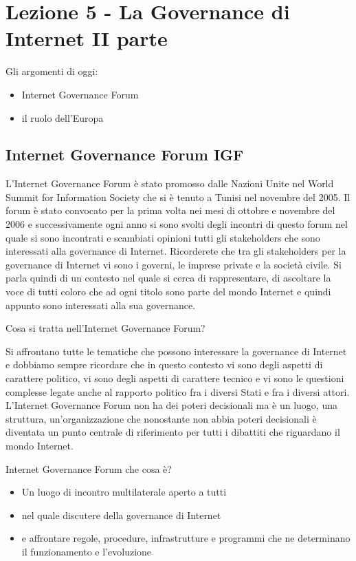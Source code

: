\chapter{Lezione 5 - La Governance di Internet II parte}

Gli argomenti di oggi:

\begin{itemize}
    \item Internet Governance Forum
    \item il ruolo dell'Europa
\end{itemize}

\section{Internet Governance Forum IGF}

L'Internet Governance Forum è stato promosso dalle Nazioni Unite nel World Summit for Information Society che si è tenuto a Tunisi nel novembre del 2005. Il forum è stato convocato per la prima volta nei mesi di ottobre e novembre del 2006 e successivamente ogni anno si sono svolti degli incontri di questo forum nel quale si sono incontrati e scambiati opinioni tutti gli stakeholders che sono interessati alla governance di Internet. Ricorderete che tra gli stakeholders per la governance di Internet vi sono i governi, le imprese private e la società civile. Si parla quindi di un contesto nel quale si cerca di rappresentare, di ascoltare la voce di tutti coloro che ad ogni titolo sono parte del mondo Internet e quindi appunto sono interessati alla sua governance.

Cosa si tratta nell'Internet Governance Forum?

Si affrontano tutte le tematiche che possono interessare la governance di Internet e dobbiamo sempre ricordare che in questo contesto vi sono degli aspetti di carattere politico, vi sono degli aspetti di carattere tecnico e vi sono le questioni complesse legate anche al rapporto politico fra i diversi Stati e fra i diversi attori. L'Internet Governance Forum non ha dei poteri decisionali ma è un luogo, una struttura, un'organizzazione che nonostante non abbia poteri decisionali è diventata un punto centrale di riferimento per tutti i dibattiti che riguardano il mondo Internet.

Internet Governance Forum che cosa è?

\begin{itemize}
    \item Un luogo di incontro multilaterale aperto a tutti
    \item nel quale discutere della governance di Internet
    \item e affrontare regole, procedure, infrastrutture e programmi che ne determinano il funzionamento e l'evoluzione
\end{itemize}

